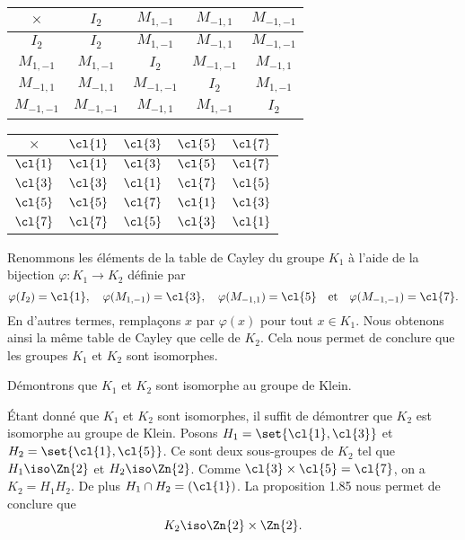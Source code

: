 \begin{enumerate}
    \begin{center}
      \begin{tabular}{c|cccc}
        $\times$    & $I_2$       & $M_{1,-1}$  & $M_{-1,1}$  & $M_{-1,-1}$ \\
        \midrule
        $I_2$       & $I_2$       & $M_{1,-1}$  & $M_{-1,1}$  & $M_{-1,-1}$ \\
        $M_{1,-1}$  & $M_{1,-1}$  & $I_2$       & $M_{-1,-1}$ & $M_{-1,1}$  \\
        $M_{-1,1}$  & $M_{-1,1}$  & $M_{-1,-1}$ & $I_2$       & $M_{1,-1}$  \\
        $M_{-1,-1}$ & $M_{-1,-1}$ & $M_{-1,1}$  & $M_{1,-1}$  & $I_2$
      \end{tabular}
    \end{center}
    \begin{center}
      \begin{tabular}{c|cccc}
        $\times$ & $\cl{1}$ & $\cl{3}$ & $\cl{5}$ & $\cl{7}$ \\
        \midrule
        $\cl{1}$ & $\cl{1}$ & $\cl{3}$ & $\cl{5}$ & $\cl{7}$ \\
        $\cl{3}$ & $\cl{3}$ & $\cl{1}$ & $\cl{7}$ & $\cl{5}$ \\
        $\cl{5}$ & $\cl{5}$ & $\cl{7}$ & $\cl{1}$ & $\cl{3}$ \\
        $\cl{7}$ & $\cl{7}$ & $\cl{5}$ & $\cl{3}$ & $\cl{1}$
      \end{tabular}
    \end{center}

    Renommons les éléments de la table de Cayley du groupe $K_1$ à l'aide de la
    bijection $\varphi\colon K_1\to K_2$ définie par
    \[
      \varphi(I_2) = \cl{1},\quad 
      \varphi(M_{1,-1}) = \cl{3}, \quad
      \varphi(M_{-1,1}) = \cl{5} \quad\text{et}\quad
      \varphi(M_{-1,-1}) = \cl{7}.
    \]
    En d'autres termes, remplaçons $x$ par $\varphi(x)$ pour tout $x\in K_1$.
    Nous obtenons ainsi la même table de Cayley que celle de $K_2$. Cela nous
    permet de conclure que les groupes $K_1$ et $K_2$ sont isomorphes.

    Démontrons que $K_1$ et $K_2$ sont isomorphe au groupe de Klein.

    Étant donné que $K_1$ et $K_2$ sont isomorphes, il suffit de démontrer que
    $K_2$ est isomorphe au groupe de Klein.  Posons $H_1 = \set{\cl{1},\cl{3}}$
    et $H_2 = \set{\cl{1},\cl{5}}$. Ce sont deux sous-groupes de $K_2$ tel que
    $H_1\iso\Zn{2}$ et $H_2\iso\Zn{2}$.  Comme
    $\cl{3}\times\cl{5}=\cl{7}$, on a $K_2 = H_1H_2$. 
    De plus $H_1\cap H_2 = (\cl{1})$. La proposition 1.85 nous permet de
    conclure que
    \[
      K_2\iso\Zn{2}\times\Zn{2}.
    \]
\end{enumerate}

